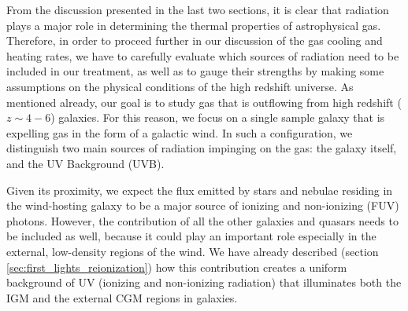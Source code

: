 From the discussion presented in the last two sections, it is clear that radiation plays a major role in determining the thermal properties of astrophysical gas. Therefore, in order to proceed further in our discussion of the gas cooling and heating rates, we have to carefully evaluate which sources of radiation need to be included in our treatment, as well as to gauge their strengths by making some assumptions on the physical conditions of the high redshift universe. As mentioned already, our goal is to study gas that is outflowing from high redshift ($z\sim 4-6$) galaxies. For this reason, we focus on a single sample galaxy that is expelling gas in the form of a galactic wind. In such a configuration, we distinguish two main sources of radiation impinging on the gas: the galaxy itself, and the UV Background (UVB). 

Given its proximity, we expect the flux emitted by stars and nebulae residing in the wind-hosting galaxy to be a major source of ionizing and non-ionizing (FUV) photons. However, the contribution of all the other galaxies and quasars needs to be included as well, because it could play an important role especially in the external, low-density regions of the wind. We have already described (section \ref{sec:first_lights_reionization}) how this contribution creates a uniform background of UV (ionizing and non-ionizing radiation) that illuminates both the IGM and the external CGM regions in galaxies.

